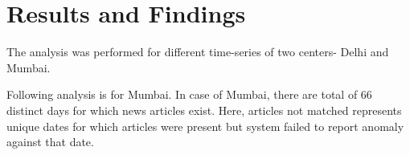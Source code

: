 \chapter{Results and Findings}

The analysis was performed for different time-series of two centers- Delhi and Mumbai.

Following analysis is for Mumbai. In case of Mumbai, there are total of 66 distinct days for which news articles exist. Here, articles not matched represents unique dates for which articles were present but system failed to report anomaly against that date.

\begin{table}[H]
\centering
{}
\caption{System Result for Mumbai}
\label{result}
\end{table}


